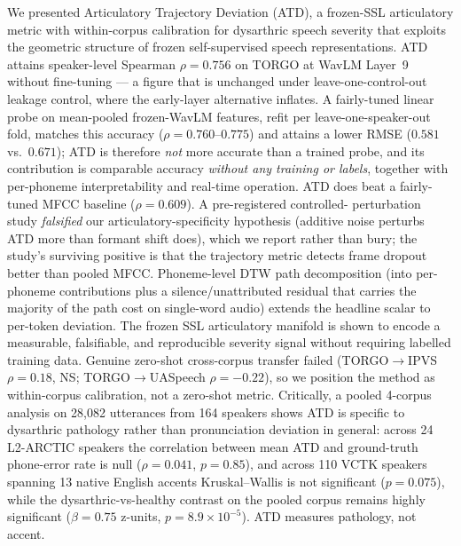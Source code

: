 
We presented Articulatory Trajectory Deviation (ATD), a frozen-SSL
articulatory metric with within-corpus calibration for dysarthric
speech severity that exploits the geometric structure of frozen
self-supervised speech representations. ATD attains speaker-level
Spearman $\rho{=}0.756$ on TORGO at WavLM Layer~9 without fine-tuning ---
a figure that is unchanged under leave-one-control-out leakage control,
where the early-layer alternative inflates. A fairly-tuned linear probe on
mean-pooled frozen-WavLM features, refit per leave-one-speaker-out fold,
matches this accuracy ($\rho{=}0.760$--$0.775$) and attains a lower RMSE
($0.581$ vs.\ $0.671$); ATD is therefore \emph{not} more accurate than a
trained probe, and its contribution is comparable accuracy \emph{without
any training or labels}, together with per-phoneme interpretability and
real-time operation. ATD does beat a fairly-tuned MFCC baseline
($\rho{=}0.609$). A pre-registered controlled-
perturbation study \emph{falsified} our articulatory-specificity
hypothesis (additive noise perturbs ATD more than formant shift does),
which we report rather than bury; the study's surviving positive is that
the trajectory metric detects frame dropout better than pooled MFCC.
Phoneme-level DTW path decomposition (into per-phoneme contributions plus
a silence/unattributed residual that carries the majority of the path
cost on single-word audio) extends the headline scalar to per-token
deviation. The frozen SSL articulatory manifold is shown to encode a
measurable, falsifiable, and reproducible severity signal without
requiring labelled training data. Genuine zero-shot cross-corpus transfer
failed (TORGO$\to$IPVS $\rho{=}0.18$, NS; TORGO$\to$UASpeech
$\rho{=}-0.22$), so we position the method as within-corpus calibration,
not a zero-shot metric. Critically,
a pooled 4-corpus analysis on 28{,}082 utterances from 164 speakers
shows ATD is specific to dysarthric pathology rather than pronunciation
deviation in general: across 24 L2-ARCTIC speakers the correlation
between mean ATD and ground-truth phone-error rate is null
($\rho{=}0.041$, $p{=}0.85$), and across 110 VCTK speakers spanning 13
native English accents Kruskal--Wallis is not significant
($p{=}0.075$), while the dysarthric-vs-healthy contrast on the pooled
corpus remains highly significant ($\hat{\beta}{=}0.75$ z-units,
$p{=}8.9{\times}10^{-5}$). ATD measures pathology, not accent.
